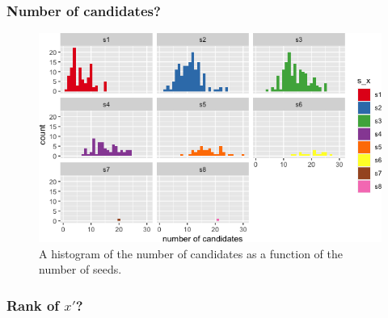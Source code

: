 \documentclass[
]{article}
\begin{document}
\hypertarget{number-of-candidates-2}{%
\subsubsection{Number of candidates?}\label{number-of-candidates-2}}

\begin{figure}
\centering
\includegraphics{vn_files/figure-latex/ccand2-1.png}
\caption{A histogram of the number of candidates as a function of the
number of seeds.}
\end{figure}

\hypertarget{rank-of-x-2}{%
\subsubsection{\texorpdfstring{Rank of
\(x'\)?}{Rank of x'?}}\label{rank-of-x-2}}
\end{document}
